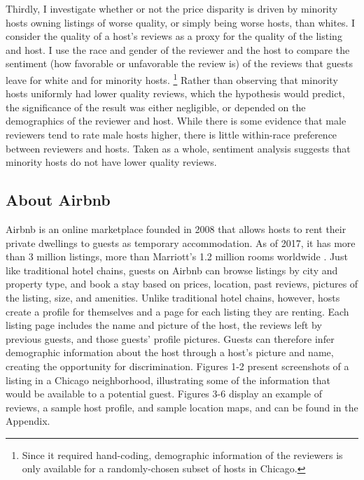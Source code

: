 Thirdly, I investigate whether or not the price disparity is driven by minority hosts owning listings of worse quality, or simply being worse hosts, than whites. I consider the quality of a host's reviews as a proxy for the quality of the listing and host. I use the race and gender of the reviewer and the host to compare the sentiment (how favorable or unfavorable the review is) of the reviews that guests leave for white and for minority hosts.%
	\footnote{Since it required hand-coding, demographic information of the reviewers is only available for a randomly-chosen subset of hosts in Chicago.} 
Rather than observing that minority hosts uniformly had lower quality reviews, which the hypothesis would predict, the significance of the result was either negligible, or depended on the demographics of the reviewer and host. While there is some evidence that male reviewers tend to rate male hosts higher, there is little within-race preference between reviewers and hosts. Taken as a whole, sentiment analysis suggests that minority hosts do not have lower quality reviews. 

\subsection{About Airbnb} 
Airbnb is an online marketplace founded in 2008 that allows hosts to rent their private dwellings to guests as temporary accommodation. As of 2017, it has more than 3 million listings, more than Marriott's 1.2 million rooms worldwide \citep{aboutus}. Just like traditional hotel chains, guests on Airbnb can browse listings by city and property type, and book a stay based on prices, location, past reviews, pictures of the listing, size, and amenities. Unlike traditional hotel chains, however, hosts create a profile for themselves and a page for each listing they are renting. Each listing page includes the name and picture of the host, the reviews left by previous guests, and those guests' profile pictures. Guests can therefore infer demographic information about the host through a host's picture and name, creating the opportunity for discrimination. Figures 1-2 present screenshots of a listing in a Chicago neighborhood, illustrating some of the information that would be available to a potential guest. Figures 3-6 display an example of reviews, a sample host profile, and sample location maps, and can be found in the Appendix.


